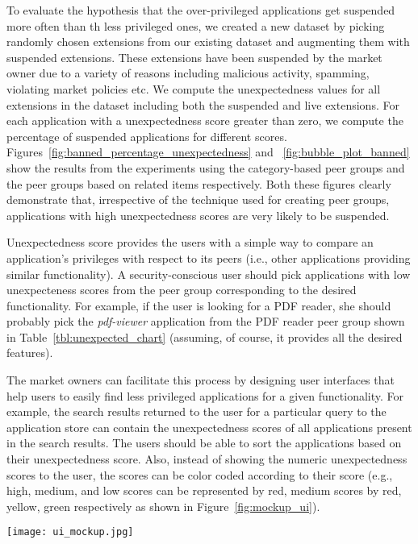 To evaluate the hypothesis that the over-privileged applications get suspended more often than th less 
privileged ones, we created a new dataset by picking  randomly chosen extensions from 
our existing \ChromeMarket{} dataset and augmenting them with   suspended extensions. These 
extensions have been suspended by the market owner due to a variety of reasons including malicious 
activity, spamming, violating market policies etc.  We compute the unexpectedness values for all extensions 
in the dataset including both the suspended and live extensions. For each 
application with a unexpectedness score greater than zero, we compute the percentage of suspended applications 
for different scores. Figures~\ref{fig:banned_percentage_unexpectedness} and ~\ref{fig:bubble_plot_banned} 
show the results  from the experiments using the category-based peer groups and the peer groups based on 
related items respectively. Both these figures clearly demonstrate that, irrespective of the
technique used for creating peer groups, applications with high unexpectedness scores are very 
likely to be suspended. 


Unexpectedness score provides the users with a simple way to compare an application's privileges 
with respect to its peers (i.e., other applications providing similar functionality). A security-conscious 
user should pick applications with low unexpecteness scores from the peer group corresponding to the 
desired functionality. For example, if the user is looking for a PDF reader, she should probably pick 
the {\it pdf-viewer} application from the PDF reader peer group shown in Table~\ref{tbl:unexpected_chart}
(assuming, of course, it provides all the desired features).

The market owners can facilitate this process by designing user interfaces that help users to 
easily find less privileged applications for a given functionality. For example, the search results 
returned to the user for a particular query to the application store can contain the unexpectedness 
scores of all applications present in the search results. The users should be able to 
sort the applications based on their unexpectedness score. Also, instead of showing 
the numeric unexpectedness scores to the user, the scores can be color coded 
according to their score (e.g., high, medium, and low scores can be represented by red, 
medium scores by red, yellow, green respectively as shown in Figure~\ref{fig:mockup_ui}).    

\begin{figure*}[!tbp]
\centering
\texttt{[image: ui\_mockup.jpg]}
\caption{A sample interface for displaying color-coded unexpectedness scores of each application 
present in the search results.} 
\label{fig:mockup_ui}
\end{figure*}

